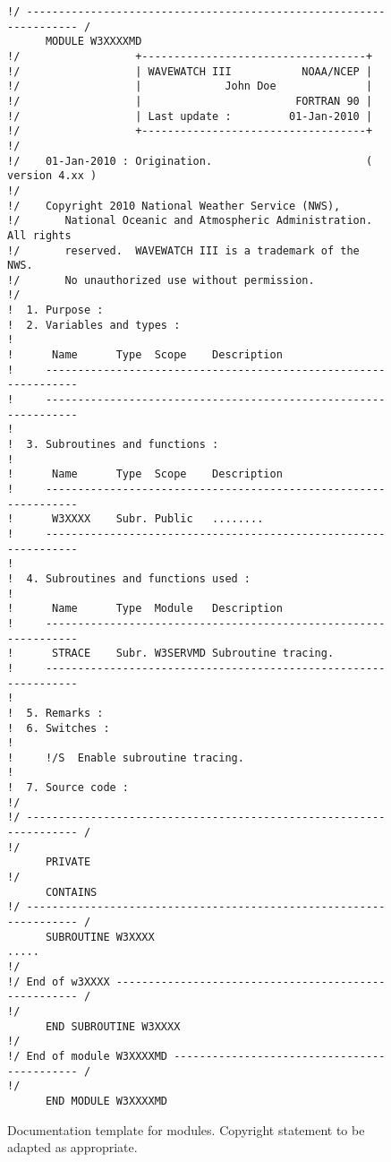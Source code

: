 \documentclass[12pt]{article}
\newcounter{myfigno}[section]
\newenvironment{myfig}[1]{\begin{figure}[#1]
                         \refstepcounter{myfigno}}                       
                        {\end{figure}}
\newcommand{\myfcap}[1]{\begin{list}{\ff Fig. \themyfigno\ :~\hfill}
                       {\rightmargin 8mm \labelsep 0mm
                        \labelwidth 8mm \leftmargin 8mm
                        \topsep 0mm \parskip 0mm \partopsep 0mm }
                        \item \ff #1 \end{list}}
\renewcommand{\themyfigno}{\thesection.\arabic{myfigno}}
\begin{document}
\begin{myfig}{tbp}
\begin{center}
\begin{minipage}[c]{4.5in}
{\scriptsize \begin{verbatim}
!/ ------------------------------------------------------------------- /
      MODULE W3XXXXMD
!/                  +-----------------------------------+
!/                  | WAVEWATCH III           NOAA/NCEP |
!/                  |             John Doe              |
!/                  |                        FORTRAN 90 |
!/                  | Last update :         01-Jan-2010 |
!/                  +-----------------------------------+
!/
!/    01-Jan-2010 : Origination.                        ( version 4.xx )
!/
!/    Copyright 2010 National Weather Service (NWS),
!/       National Oceanic and Atmospheric Administration.  All rights
!/       reserved.  WAVEWATCH III is a trademark of the NWS. 
!/       No unauthorized use without permission.
!/
!  1. Purpose :
!  2. Variables and types :
!
!      Name      Type  Scope    Description
!     ----------------------------------------------------------------
!     ----------------------------------------------------------------
!
!  3. Subroutines and functions :
!
!      Name      Type  Scope    Description
!     ----------------------------------------------------------------
!      W3XXXX    Subr. Public   ........
!     ----------------------------------------------------------------
!
!  4. Subroutines and functions used :
!
!      Name      Type  Module   Description
!     ----------------------------------------------------------------
!      STRACE    Subr. W3SERVMD Subroutine tracing.
!     ----------------------------------------------------------------
!
!  5. Remarks :
!  6. Switches :
!
!     !/S  Enable subroutine tracing.
!
!  7. Source code :
!/
!/ ------------------------------------------------------------------- /
!/
      PRIVATE
!/
      CONTAINS
!/ ------------------------------------------------------------------- /
      SUBROUTINE W3XXXX
.....
!/
!/ End of w3XXXX ----------------------------------------------------- /
!/
      END SUBROUTINE W3XXXX
!/
!/ End of module W3XXXXMD -------------------------------------------- /
!/
      END MODULE W3XXXXMD
\end{verbatim}}
\end{minipage}
\end{center}

\myfcap{Documentation template for modules. Copyright statement to be adapted
        as appropriate.}
\label{fig:docu_mod}
\end{myfig}
\end{document}

